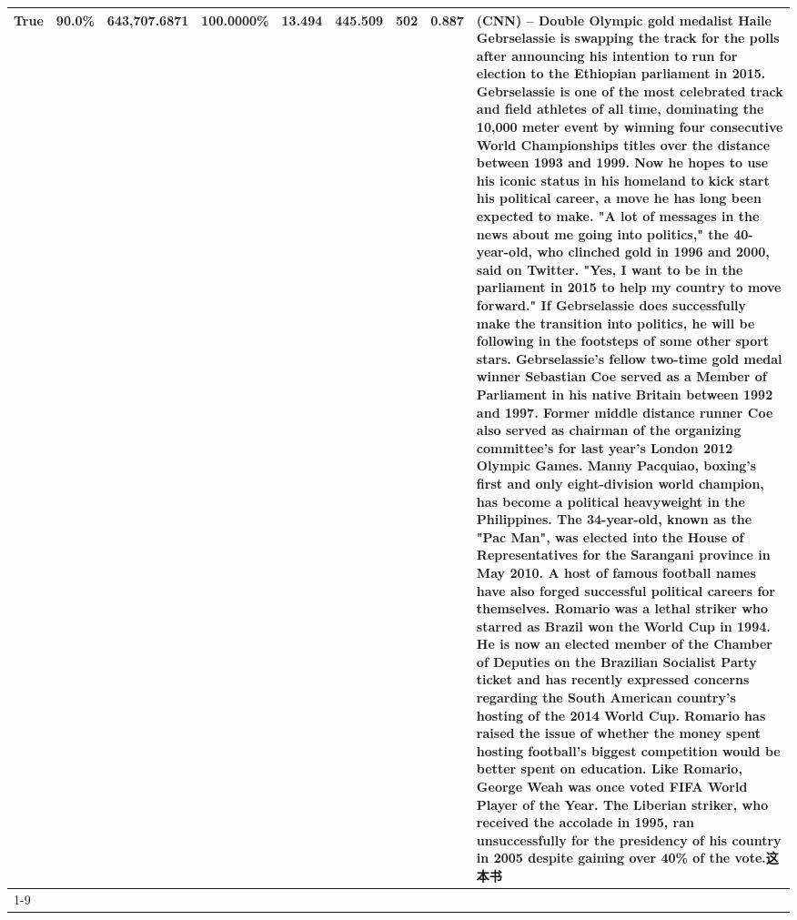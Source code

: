 \begin{table}[H]
{\begin{tabular}{lllrlllll}
True & 90.0\% & 643,707.6871 & \bfseries \color{red} 100.0000\% & 13.494 & 445.509 & 502 & 0.887 & (CNN) -- Double Olympic gold medalist Haile Gebrselassie is swapping the track for the polls after announcing his intention to run for election to the Ethiopian parliament in 2015. Gebrselassie is one of the most celebrated track and field athletes of all time, dominating the 10,000 meter event by winning four consecutive World Championships titles over the distance between 1993 and 1999. Now he hopes to use his iconic status in his homeland to kick start his political career, a move he has long been expected to make. "A lot of messages in the news about me going into politics," the 40-year-old, who clinched gold in 1996 and 2000, said on Twitter. "Yes, I want to be in the parliament in 2015 to help my country to move forward." If Gebrselassie does successfully make the transition into politics, he will be following in the footsteps of some other sport stars. Gebrselassie's fellow two-time gold medal winner Sebastian Coe served as a Member of Parliament in his native Britain between 1992 and 1997. Former middle distance runner Coe also served as chairman of the organizing committee's for last year's London 2012 Olympic Games. Manny Pacquiao, boxing's first and only eight-division world champion, has become a political heavyweight in the Philippines. The 34-year-old, known as the "Pac Man", was elected into the House of Representatives for the Sarangani province in May 2010. A host of famous football names have also forged successful political careers for themselves. Romario was a lethal striker who starred as Brazil won the World Cup in 1994. He is now an elected member of the Chamber of Deputies on the Brazilian Socialist Party ticket and has recently expressed concerns regarding the South American country's hosting of the 2014 World Cup. Romario has raised the issue of whether the money spent hosting football's biggest competition would be better spent on education. Like Romario, George Weah was once voted FIFA World Player of the Year. The Liberian striker, who received the accolade in 1995, ran unsuccessfully for the presidency of his country in 2005 despite gaining over 40\% of the vote.这本书 \\
\cline{1-9}

\end{tabular}}
\end{table}
